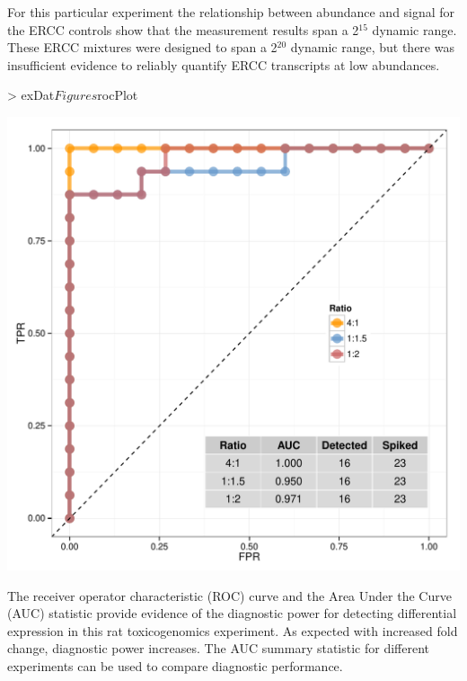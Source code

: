 \documentclass{article}
\begin{document}
For this particular experiment the relationship between abundance and signal for
the ERCC controls show that the measurement results span a 2$^{15}$ dynamic range.
These ERCC mixtures were designed to span a 2$^{20}$ dynamic range, but there was 
insufficient evidence to reliably quantify ERCC transcripts at low 
abundances.
\clearpage
\begin{center}
\begin{Schunk}
\begin{Sinput}
> exDat$Figures$rocPlot
\end{Sinput}
\end{Schunk}
\includegraphics{erccdashboardVignette-ratPlotB}
\end{center}
The receiver operator characteristic (ROC) curve and the Area Under the Curve (AUC)
statistic provide evidence of the diagnostic power for detecting differential expression
in this rat toxicogenomics experiment. As expected with increased fold change,
diagnostic power increases. The AUC summary statistic for different experiments
can be used to compare diagnostic performance.
\clearpage
\end{document}
